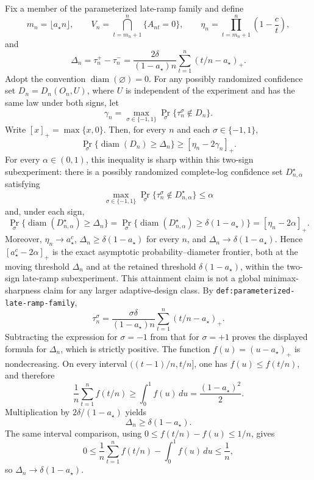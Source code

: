Fix a member of the parameterized late-ramp family and define
\[
 m_n=\lfloor a_\star n\rfloor,\qquad
 V_n=\bigcap_{t=m_n+1}^{n}\{A_{nt}=0\},\qquad
 \eta_n=\prod_{t=m_n+1}^{n}\left(1-\frac ct\right),
\]
and
\[
 \Delta_n=\tau_n^+-\tau_n^-
 =\frac{2\delta}{(1-a_\star)n}
   \sum_{t=1}^{n}(t/n-a_\star)_+.
\]
Adopt the convention \(\operatorname{diam}(\varnothing)=0\). For any possibly randomized confidence set \(D_n=D_n(O_n,U)\), where \(U\) is independent of the experiment and has the same law under both signs, let
\[
 \gamma_n=\max_{\sigma\in\{-1,1\}}
 \Pr_\sigma\{\tau_n^\sigma\notin D_n\}.
\]
Write \([x]_+=\max\{x,0\}\). Then, for every \(n\) and each \(\sigma\in\{-1,1\}\),
\[
 \Pr_\sigma\{\operatorname{diam}(D_n)\ge \Delta_n\}
 \ge [\eta_n-2\gamma_n]_+.
\]
For every \(\alpha\in(0,1)\), this inequality is sharp within this two-sign subexperiment: there is a possibly randomized complete-log confidence set \(D_{n,\alpha}^\star\) satisfying
\[
 \max_{\sigma\in\{-1,1\}}
 \Pr_\sigma\{\tau_n^\sigma\notin D_{n,\alpha}^\star\}\le\alpha
\]
and, under each sign,
\[
 \Pr_\sigma\{\operatorname{diam}(D_{n,\alpha}^\star)\ge\Delta_n\}
 =\Pr_\sigma\{\operatorname{diam}(D_{n,\alpha}^\star)\ge\delta(1-a_\star)\}
 =[\eta_n-2\alpha]_+.
\]
Moreover, \(\eta_n\to a_\star^c\), \(\Delta_n\ge\delta(1-a_\star)\) for every \(n\), and \(\Delta_n\to\delta(1-a_\star)\). Hence \([a_\star^c-2\alpha]_+\) is the exact asymptotic probability--diameter frontier, both at the moving threshold \(\Delta_n\) and at the retained threshold \(\delta(1-a_\star)\), within the two-sign late-ramp subexperiment. This attainment claim is not a global minimax-sharpness claim for any larger adaptive-design class.
By \texttt{def:parameterized-late-ramp-family},
\[
 \tau_n^\sigma
 =\frac{\sigma\delta}{(1-a_\star)n}
   \sum_{t=1}^{n}(t/n-a_\star)_+.
\]
Subtracting the expression for \(\sigma=-1\) from that for \(\sigma=+1\) proves the displayed formula for \(\Delta_n\), which is strictly positive. The function \(f(u)=(u-a_\star)_+\) is nondecreasing. On every interval \(((t-1)/n,t/n]\), one has \(f(u)\le f(t/n)\), and therefore
\[
 \frac1n\sum_{t=1}^{n}f(t/n)
 \ge \int_0^1 f(u)\,du
 =\frac{(1-a_\star)^2}{2}.
\]
Multiplication by \(2\delta/(1-a_\star)\) yields
\[
 \Delta_n\ge\delta(1-a_\star).
\]
The same interval comparison, using
\(0\le f(t/n)-f(u)\le 1/n\), gives
\[
 0\le \frac1n\sum_{t=1}^{n}f(t/n)-\int_0^1f(u)\,du\le\frac1n,
\]
so \(\Delta_n\to\delta(1-a_\star)\).

